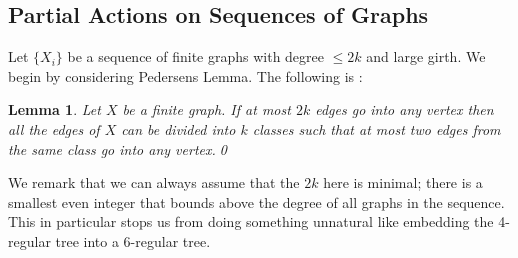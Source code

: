 \documentclass[11pt]{amsart}
\theoremstyle{plain}
\newtheorem{lemma}[theorem]{Lemma}%
\theoremstyle{definition}%
\theoremstyle{remark}%
\begin{document}
\subsection{Partial Actions on Sequences of Graphs}
Let $\lbrace X_{i} \rbrace$ be a sequence of finite graphs with degree $\leq 2k$ and large girth. We begin by considering Pedersens Lemma. The following is \cite[Theorem 6, Chapter XI]{MR1035708}:

\begin{lemma}\label{Lem:GenPet}
Let $X$ be a finite graph. If at most $2k$ edges go into any vertex then all the edges of $X$ can be divided into $k$ classes such that at most two edges from the same class go into any vertex.\qed
\end{lemma}

We remark that we can always assume that the $2k$ here is minimal; there is a smallest even integer that bounds above the degree of all graphs in the sequence. This in particular stops us from doing something unnatural like embedding the 4-regular tree into a 6-regular tree.
\end{document}
